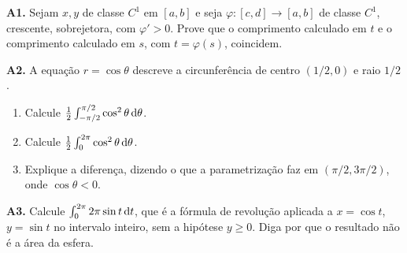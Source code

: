 \documentclass[11pt,a4paper]{article}
\begin{document}
\begin{exercicio}
\textbf{A1.} Sejam \(x,y\) de classe \(C^1\) em \([a,b]\) e seja \(\varphi:[c,d]\to[a,b]\) de classe \(C^1\), crescente, sobrejetora, com \(\varphi'>0\). Prove que o comprimento calculado em \(t\) e o comprimento calculado em \(s\), com \(t=\varphi(s)\), coincidem.
\end{exercicio}

\begin{exercicio}
\textbf{A2.} A equação \(r=\cos\theta\) descreve a circunferência de centro \((1/2,0)\) e raio \(1/2\).
\begin{enumerate}
\item Calcule \(\frac12\int_{-\pi/2}^{\pi/2}\cos^{2}\theta\,\mathrm{d}\theta\).
\item Calcule \(\frac12\int_{0}^{2\pi}\cos^{2}\theta\,\mathrm{d}\theta\).
\item Explique a diferença, dizendo o que a parametrização faz em \((\pi/2,3\pi/2)\), onde \(\cos\theta<0\).
\end{enumerate}
\end{exercicio}

\begin{exercicio}
\textbf{A3.} Calcule \(\int_{0}^{2\pi} 2\pi\sin t\,\mathrm{d} t\), que é a fórmula de revolução aplicada a \(x=\cos t\), \(y=\sin t\) no intervalo inteiro, sem a hipótese \(y\ge 0\). Diga por que o resultado não é a área da esfera.
\end{exercicio}
\end{document}
